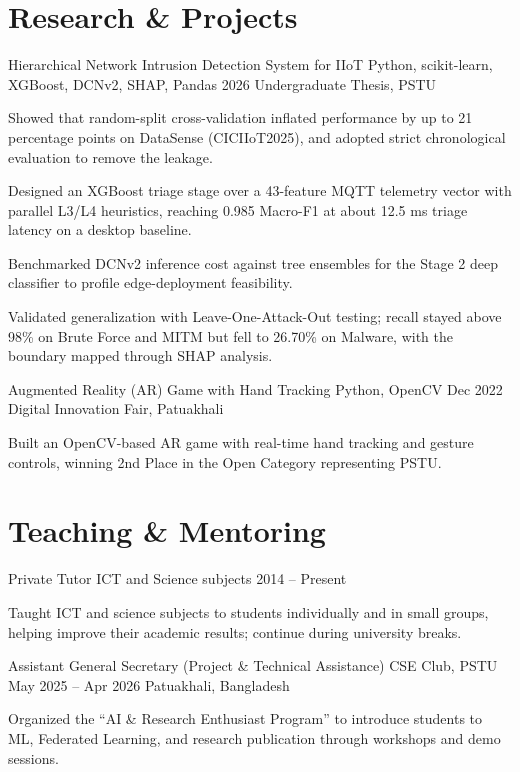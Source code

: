 \documentclass[11pt, a4paper]{article}
\begin{document}
\section{Research \& Projects}
\cvProject
    {Hierarchical Network Intrusion Detection System for IIoT}
    {Python, scikit-learn, XGBoost, DCNv2, SHAP, Pandas}
    {2026}
    {Undergraduate Thesis, PSTU}
    {
        \item Showed that random-split cross-validation inflated performance by up to 21 percentage points on DataSense (CICIIoT2025), and adopted strict chronological evaluation to remove the leakage.
        \item Designed an XGBoost triage stage over a 43-feature MQTT telemetry vector with parallel L3/L4 heuristics, reaching 0.985 Macro-F1 at about 12.5 ms triage latency on a desktop baseline.
        \item Benchmarked DCNv2 inference cost against tree ensembles for the Stage 2 deep classifier to profile edge-deployment feasibility.
        \item Validated generalization with Leave-One-Attack-Out testing; recall stayed above 98\% on Brute Force and MITM but fell to 26.70\% on Malware, with the boundary mapped through SHAP analysis.
    }

\cvProject
    {Augmented Reality (AR) Game with Hand Tracking}
    {Python, OpenCV}
    {Dec 2022}
    {Digital Innovation Fair, Patuakhali}
    {
        \item Built an OpenCV-based AR game with real-time hand tracking and gesture controls, winning 2nd Place in the Open Category representing PSTU.
    }


\section{Teaching \& Mentoring}
\cvExperience
    {Private Tutor}
    {ICT and Science subjects}
    {2014 -- Present}
    {}
    {
        \item Taught ICT and science subjects to students individually and in small groups, helping improve their academic results; continue during university breaks.
    }

\cvExperience
    {Assistant General Secretary (Project \& Technical Assistance)}
    {CSE Club, PSTU}
    {May 2025 -- Apr 2026}
    {Patuakhali, Bangladesh}
    {
        \item Organized the ``AI \& Research Enthusiast Program'' to introduce students to ML, Federated Learning, and research publication through workshops and demo sessions.
    }
\end{document}

